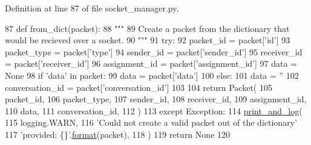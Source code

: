 Definition at line 87 of file socket\+\_\+manager.\+py.


\begin{DoxyCode}
87     \textcolor{keyword}{def }from\_dict(packet):
88         \textcolor{stringliteral}{"""}
89 \textcolor{stringliteral}{        Create a packet from the dictionary that would be recieved over a socket.}
90 \textcolor{stringliteral}{        """}
91         \textcolor{keywordflow}{try}:
92             packet\_id = packet[\textcolor{stringliteral}{'id'}]
93             packet\_type = packet[\textcolor{stringliteral}{'type'}]
94             sender\_id = packet[\textcolor{stringliteral}{'sender\_id'}]
95             receiver\_id = packet[\textcolor{stringliteral}{'receiver\_id'}]
96             assignment\_id = packet[\textcolor{stringliteral}{'assignment\_id'}]
97             data = \textcolor{keywordtype}{None}
98             \textcolor{keywordflow}{if} \textcolor{stringliteral}{'data'} \textcolor{keywordflow}{in} packet:
99                 data = packet[\textcolor{stringliteral}{'data'}]
100             \textcolor{keywordflow}{else}:
101                 data = \textcolor{stringliteral}{''}
102             conversation\_id = packet[\textcolor{stringliteral}{'conversation\_id'}]
103 
104             \textcolor{keywordflow}{return} Packet(
105                 packet\_id,
106                 packet\_type,
107                 sender\_id,
108                 receiver\_id,
109                 assignment\_id,
110                 data,
111                 conversation\_id,
112             )
113         \textcolor{keywordflow}{except} Exception:
114             \hyperlink{namespaceparlai_1_1mturk_1_1core_1_1dev_1_1test_1_1test__full__system_a5266aae537d9c5f37809ebaf7bcc3b49}{print\_and\_log}(
115                 logging.WARN,
116                 \textcolor{stringliteral}{'Could not create a valid packet out of the dictionary'}
117                 \textcolor{stringliteral}{'provided: \{\}'}.\hyperlink{namespaceparlai_1_1chat__service_1_1services_1_1messenger_1_1shared__utils_a32e2e2022b824fbaf80c747160b52a76}{format}(packet),
118             )
119             \textcolor{keywordflow}{return} \textcolor{keywordtype}{None}
120 
\end{DoxyCode}
\mbox{\label{classparlai_1_1mturk_1_1core_1_1socket__manager_1_1Packet_a92f4ae50a21d22ab63b041f23d210928}} 
